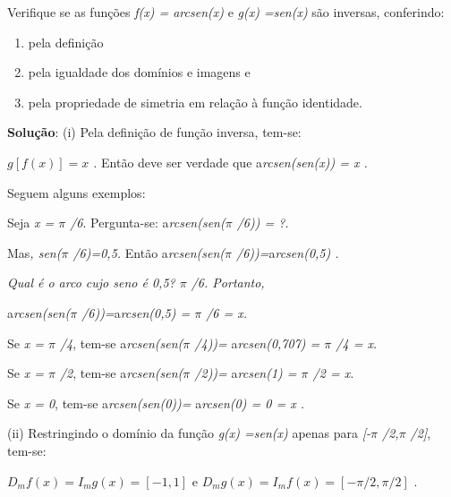 \begin{texemplo}
Verifique se as funções  \textit{f(x) = arcsen(x) }e\textit{  g(x) =sen(x) }são inversas, conferindo:

\begin{enumerate}
    \item pela definição

    \item pela igualdade dos domínios e imagens e

    \item pela propriedade de simetria em relação à função identidade.
\end{enumerate}

\textbf{Solução}: (i) Pela definição de função inversa, tem-se:

 \( g \left[ f \left( x \right)  \right] =x \) \textit{ . }Então deve ser verdade que a\textit{rcsen(sen(x)) =  x . }

Seguem alguns exemplos:

\textbullet Seja \textit{x = $ \pi $ /6}. Pergunta-se:  a\textit{rcsen(sen($ \pi $ /6)) = ?. }

Mas\textit{, sen($ \pi $ /6)=0,5. }Então a\textit{rcsen(sen($ \pi $ /6))=}a\textit{rcsen(0,5) .}

\textit{Qual é o arco cujo seno é 0,5? $ \pi $ /6. Portanto,}

a\textit{rcsen(sen($ \pi $ /6))=}a\textit{rcsen(0,5) = $ \pi $ /6 = x.}

\textbullet Se \textit{x = $ \pi $ /4}, tem-se   a\textit{rcsen(sen($ \pi $ /4))=} a\textit{rcsen(0,707) = $ \pi $ /4 = x.}

\textbullet Se \textit{x = $ \pi $ /2}, tem-se   a\textit{rcsen(sen($ \pi $ /2))=} a\textit{rcsen(1) = $ \pi $ /2 = x.}

\textbullet Se \textit{x = 0}, tem-se   a\textit{rcsen(sen(0))=} a\textit{rcsen(0) = 0 = x .}

(ii) Restringindo o domínio da função \textit{g(x) =sen(x) } apenas para \textit{[-$ \pi $ /2,$ \pi $ /2]}, tem-se:

 \( D_{m}f \left( x \right) =I_{m}g \left( x \right) = \left[ -1,1 \right]  \)   e     \( D_{m}g \left( x \right) =I_{m}f \left( x \right) = \left[ - \pi /2, \pi /2 \right]  \) .


\end{texemplo}
